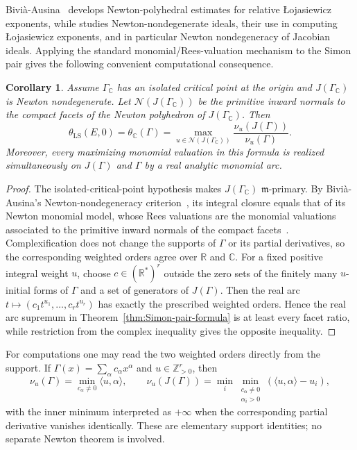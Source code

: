 \documentclass[11pt]{article}
\newtheorem{corollary}[theorem]{Corollary}
\theoremstyle{definition}
\theoremstyle{remark}
\begin{document}
Bivi\`a-Ausina~\cite{Bivia2003} develops Newton-polyhedral estimates for relative \L{}ojasiewicz exponents, while \cite{Bivia2005} studies Newton-nondegenerate ideals, their use in computing \L{}ojasiewicz exponents, and in particular Newton nondegeneracy of Jacobian ideals. Applying the standard monomial/Rees-valuation mechanism to the Simon pair gives the following convenient computational consequence.

\begin{corollary}
\label{cor:Newton-Simon}
Assume $\Gamma_{\mathbb C}$ has an isolated critical point at the origin and $J(\Gamma_{\mathbb C})$ is Newton nondegenerate. Let $\mathcal N(J(\Gamma_{\mathbb C}))$ be the primitive inward normals to the compact facets of the Newton polyhedron of $J(\Gamma_{\mathbb C})$. Then
$$
\theta_{\mathrm{LS}}(E,0)
=\theta_{\mathbb C}(\Gamma)
=\max_{u\in\mathcal N(J(\Gamma_{\mathbb C}))}
\frac{\nu_u(J(\Gamma))}{\nu_u(\Gamma)}.
$$
Moreover, every maximizing monomial valuation in this formula is realized simultaneously on $J(\Gamma)$ and $\Gamma$ by a real analytic monomial arc.
\end{corollary}

\begin{proof}
The isolated-critical-point hypothesis makes $J(\Gamma_{\mathbb C})$ $\mathfrak m$-primary. By Bivi\`a-Ausina's Newton-nondegeneracy criterion~\cite[Theorem~3.4]{Bivia2005}, its integral closure equals that of its Newton monomial model, whose Rees valuations are the monomial valuations associated to the primitive inward normals of the compact facets~\cite{HunekeSwanson2006}. Complexification does not change the supports of $\Gamma$ or its partial derivatives, so the corresponding weighted orders agree over $\mathbb R$ and $\mathbb C$. For a fixed positive integral weight $u$, choose $c\in(\mathbb R^*)^r$ outside the zero sets of the finitely many $u$-initial forms of $\Gamma$ and a set of generators of $J(\Gamma)$. Then the real arc $t\mapsto(c_1t^{u_1},\ldots,c_rt^{u_r})$ has exactly the prescribed weighted orders. Hence the real arc supremum in Theorem~\ref{thm:Simon-pair-formula} is at least every facet ratio, while restriction from the complex inequality gives the opposite inequality.
\end{proof}

For computations one may read the two weighted orders directly from the support. If $\Gamma(x)=\sum_\alpha c_\alpha x^\alpha$ and $u\in\mathbb Z_{>0}^r$, then
$$
\nu_u(\Gamma)=\min_{c_\alpha\ne0}\langle u,\alpha\rangle,
\qquad
\nu_u(J(\Gamma))=
\min_i\min_{\substack{c_\alpha\ne0\\ \alpha_i>0}}
(\langle u,\alpha\rangle-u_i),
$$
with the inner minimum interpreted as $+\infty$ when the corresponding partial derivative vanishes identically. These are elementary support identities; no separate Newton theorem is involved.
\end{document}
